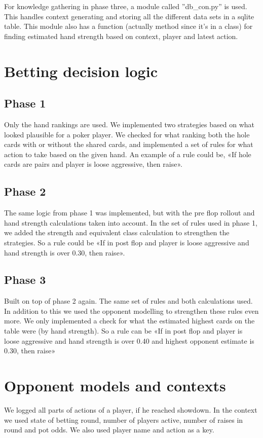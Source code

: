 \documentclass[a4paper, 12pt]{article}
\begin{document}
For knowledge gathering in phase three, a module called ''db\_con.py'' is used. This handles context generating and storing all the different data sets in a sqlite table. This module also has a function (actually method since it’s in a class) for finding estimated hand strength based on context, player and latest action.

\section{Betting decision logic}

\subsection{Phase 1}
Only the hand rankings are used. We implemented two strategies based on what looked plausible for a poker player. We checked for what ranking both the hole cards with or without the shared cards, and implemented a set of rules for what action to take based on the given hand. An example of a rule could be, «If hole cards are pairs and player is loose aggressive, then raise». 

\subsection{Phase 2}
The same logic from phase 1 was implemented, but with the pre flop rollout and hand strength calculations taken into account. In the set of rules used in phase 1, we added the strength and equivalent class calculation to strengthen the strategies. So a rule could be «If in post flop and player is loose aggressive and hand strength is over 0.30, then raise».

\subsection{Phase 3}
Built on top of phase 2 again. The same set of rules and both calculations used. In addition to this we used the opponent modelling to strengthen these rules even more. We only implemented a check for what the estimated highest cards on the table were (by hand strength). So a rule can be «If in post flop and player is loose aggressive and hand strength is over 0.40 and highest opponent estimate is 0.30, then raise»

\section{Opponent models and contexts}
We logged all parts of actions of a player, if he reached showdown. In the context we used state of betting round, number of players active, number of raises in round and pot odds. We also used player name and action as a key.
\end{document}
